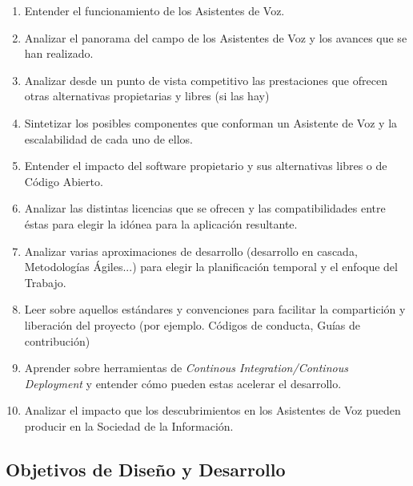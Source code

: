 \begin{enumerate}[O-{IA}.1 -]
	\item Entender el funcionamiento de los Asistentes de Voz.
	\item Analizar el panorama del campo de los Asistentes de Voz y los avances que se han realizado.
	\item Analizar desde un punto de vista competitivo las prestaciones que ofrecen otras alternativas propietarias y libres (si las hay)
	\item Sintetizar los posibles componentes que conforman un Asistente de Voz y la escalabilidad de cada uno de ellos.
	\item Entender el impacto del software propietario y sus alternativas libres o de Código Abierto.
	\item Analizar las distintas licencias que se ofrecen y las compatibilidades entre éstas para elegir la idónea para la aplicación resultante.
	\item Analizar varias aproximaciones de desarrollo (desarrollo en cascada, Metodologías Ágiles...) para elegir la planificación temporal y el enfoque del Trabajo.
	\item Leer sobre aquellos estándares y convenciones para facilitar la compartición y liberación del proyecto (por ejemplo. Códigos de conducta, Guías de contribución)
	\item Aprender sobre herramientas de \textit{Continous Integration/Continous Deployment} y entender cómo pueden estas acelerar el desarrollo.
	\item Analizar el impacto que los descubrimientos en los Asistentes de Voz pueden producir en la Sociedad de la Información.
\end{enumerate}

\subsection{Objetivos de Diseño y Desarrollo}

